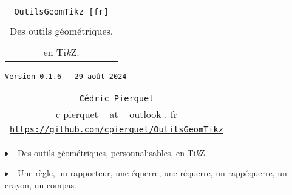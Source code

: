 \documentclass[french,a4paper,11pt]{article}
\def\TPversion{0.1.6}
\def\TPdate{29 août 2024}
\begin{document}
\setlength{\aweboxleftmargin}{0.07\linewidth}
\setlength{\aweboxcontentwidth}{0.93\linewidth}
\setlength{\aweboxvskip}{8pt}

\thispagestyle{empty}

\vspace{2cm}

\begin{center}
	\begin{minipage}{0.75\linewidth}
	\begin{tcolorbox}[colframe=yellow,colback=yellow!15]
		\begin{center}
			\begin{tabular}{c}
				{\Huge \texttt{OutilsGeomTikz [fr]}}\\
				\\
				{\LARGE Des outils géométriques, } \\
				\\
				{\LARGE en Ti\textit{k}Z}. \\
			\end{tabular}
			
			\bigskip
			
			{\small \texttt{Version \TPversion{} -- \TPdate}}
		\end{center}
	\end{tcolorbox}
\end{minipage}
\end{center}

\begin{center}
	\begin{tabular}{c}
	\texttt{Cédric Pierquet}\\
	{\ttfamily c pierquet -- at -- outlook . fr}\\
	\texttt{\url{https://github.com/cpierquet/OutilsGeomTikz}}
\end{tabular}
\end{center}

\vspace{0.25cm}

{$\blacktriangleright$~~Des outils géométriques, personnalisables, en Ti\textit{k}Z.}

\smallskip

{$\blacktriangleright$~~Une règle, un rapporteur, une équerre, une réquerre, un rappéquerre, un crayon, un compas.}

\vspace{0.5cm}
\end{document}
